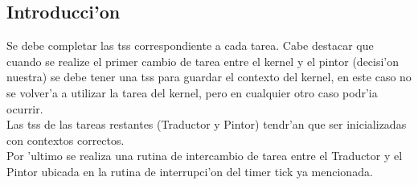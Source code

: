 \documentclass[11pt]{article}
\begin{document}
\subsection{Introducci'on}
Se debe completar las tss correspondiente a cada tarea. Cabe destacar que cuando se realize el primer cambio de tarea entre el kernel y el pintor (decisi'on nuestra) se debe tener una tss para guardar el contexto del kernel, en este caso no se volver'a a utilizar la tarea del kernel, pero en cualquier otro caso podr'ia ocurrir.\\ Las tss de las tareas restantes (Traductor y Pintor) tendr'an que ser inicializadas con contextos correctos. \\
Por 'ultimo se realiza una rutina de intercambio de tarea entre el Traductor y el Pintor ubicada en la rutina de interrupci'on del timer tick ya mencionada.
\end{document}
